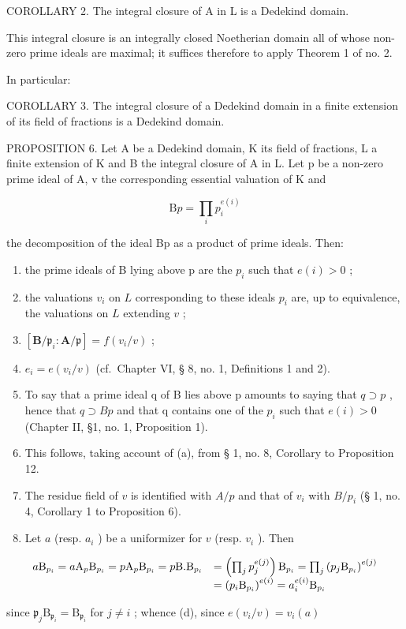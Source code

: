 COROLLARY 2. The integral closure of A in L is a Dedekind domain.

This integral closure is an integrally closed Noetherian domain all of whose non-zero prime ideals are maximal; it suffices therefore to apply Theorem 1 of no. 2.

In particular:

COROLLARY 3. The integral closure of a Dedekind domain in a finite extension of its field of fractions is a Dedekind domain.

PROPOSITION 6. Let A be a Dedekind domain, K its field of fractions, L a finite extension of K and B the integral closure of A in L. Let p be a non-zero prime ideal of A, v the corresponding essential valuation of K and

\[
\mathrm{B} p = \prod_ {i} p _ {i} ^ {e (i)}
\]

the decomposition of the ideal Bp as a product of prime ideals. Then:

\begin{enumerate}
\def\labelenumi{(\alph{enumi})}
\item
  the prime ideals of B lying above p are the \(p_{i}\) such that \(e(i) > 0\) ;
\item
  the valuations \(v_{i}\) on \(L\) corresponding to these ideals \(p_{i}\) are, up to equivalence, the valuations on \(L\) extending \(v\) ;
\item
  \([\mathbf{B} / \mathfrak{p}_i\colon \mathbf{A} / \mathfrak{p}] = f(v_i / v)\) ;
\item
  \(e_i = e(v_i / v)\) (cf.~Chapter VI, § 8, no. 1, Definitions 1 and 2).
\item
  To say that a prime ideal q of B lies above p amounts to saying that \(q \supset p\) , hence that \(q \supset Bp\) and that q contains one of the \(p_i\) such that \(e(i) > 0\) (Chapter II, §1, no. 1, Proposition 1).
\item
  This follows, taking account of (a), from § 1, no. 8, Corollary to Proposition 12.
\item
  The residue field of \(v\) is identified with \(A / p\) and that of \(v_i\) with \(B / p_i\) (§ 1, no. 4, Corollary 1 to Proposition 6).
\item
  Let \(a\) (resp. \(a_i\) ) be a uniformizer for \(v\) (resp. \(v_i\) ). Then
\end{enumerate}

\[
\begin{array}{r l} a \mathrm{B} _ {p _ {i}} = a \mathrm{A} _ {p} \mathrm{B} _ {p _ {i}} = p \mathrm{A} _ {p} \mathrm{B} _ {p _ {i}} = p \mathrm{B}. \mathrm{B} _ {p _ {i}} & = \left(\prod_ {j} p _ {j} ^ {e (j)}\right) \mathrm{B} _ {p _ {i}} = \prod_ {j} \left(p _ {j} \mathrm{B} _ {p _ {i}}\right) ^ {e (j)} \\ & = \left(p _ {i} \mathrm{B} _ {p _ {i}}\right) ^ {e (i)} = a _ {i} ^ {e (i)} \mathrm{B} _ {p _ {i}} \end{array}
\]

since \(\mathfrak{p}_j\mathrm{B}_{\mathfrak{p}_i} = \mathrm{B}_{\mathfrak{p}_i}\) for \(j\neq i\) ; whence (d), since \(e(v_{i} / v) = v_{i}(a)\)

